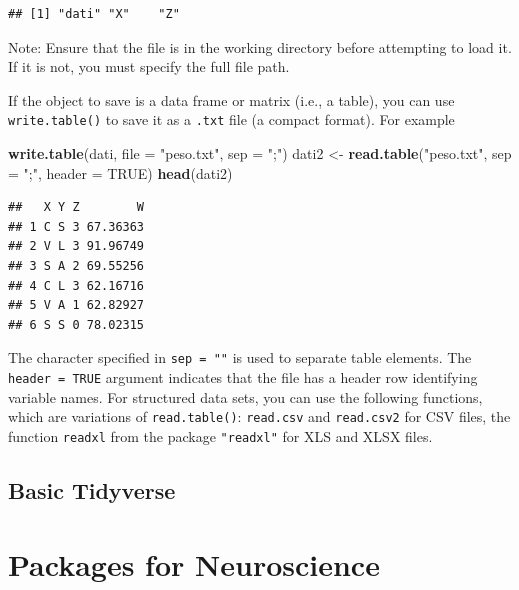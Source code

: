 \documentclass[
]{article}
\newenvironment{Shaded}{\begin{snugshade}}{\end{snugshade}}
\newcommand{\AttributeTok}[1]{\textcolor[rgb]{0.13,0.29,0.53}{#1}}
\newcommand{\ConstantTok}[1]{\textcolor[rgb]{0.56,0.35,0.01}{#1}}
\newcommand{\FunctionTok}[1]{\textcolor[rgb]{0.13,0.29,0.53}{\textbf{#1}}}
\newcommand{\NormalTok}[1]{#1}
\newcommand{\OtherTok}[1]{\textcolor[rgb]{0.56,0.35,0.01}{#1}}
\newcommand{\StringTok}[1]{\textcolor[rgb]{0.31,0.60,0.02}{#1}}
\begin{document}
\begin{verbatim}
## [1] "dati" "X"    "Z"
\end{verbatim}

Note: Ensure that the file is in the working directory before attempting
to load it. If it is not, you must specify the full file path.

If the object to save is a data frame or matrix (i.e., a table), you can
use \texttt{write.table()} to save it as a \texttt{.txt} file (a compact
format). For example

\begin{Shaded}
\begin{Highlighting}[]
\FunctionTok{write.table}\NormalTok{(dati, }\AttributeTok{file =} \StringTok{"peso.txt"}\NormalTok{, }\AttributeTok{sep =} \StringTok{";"}\NormalTok{)}
\NormalTok{dati2 }\OtherTok{\textless{}{-}} \FunctionTok{read.table}\NormalTok{(}\StringTok{"peso.txt"}\NormalTok{, }\AttributeTok{sep =} \StringTok{";"}\NormalTok{, }\AttributeTok{header =} \ConstantTok{TRUE}\NormalTok{)}
\FunctionTok{head}\NormalTok{(dati2)}
\end{Highlighting}
\end{Shaded}

\begin{verbatim}
##   X Y Z        W
## 1 C S 3 67.36363
## 2 V L 3 91.96749
## 3 S A 2 69.55256
## 4 C L 3 62.16716
## 5 V A 1 62.82927
## 6 S S 0 78.02315
\end{verbatim}

The character specified in \texttt{sep\ =\ ""} is used to separate table
elements. The \texttt{header\ =\ TRUE} argument indicates that the file
has a header row identifying variable names. For structured data sets,
you can use the following functions, which are variations of
\texttt{read.table()}: \texttt{read.csv} and \texttt{read.csv2} for CSV
files, the function \texttt{readxl} from the package \texttt{"readxl"}
for XLS and XLSX files.

\hypertarget{basic-tidyverse}{%
\subsection{Basic Tidyverse}\label{basic-tidyverse}}

\hypertarget{packages-for-neuroscience}{%
\section{Packages for Neuroscience}\label{packages-for-neuroscience}}
\end{document}
